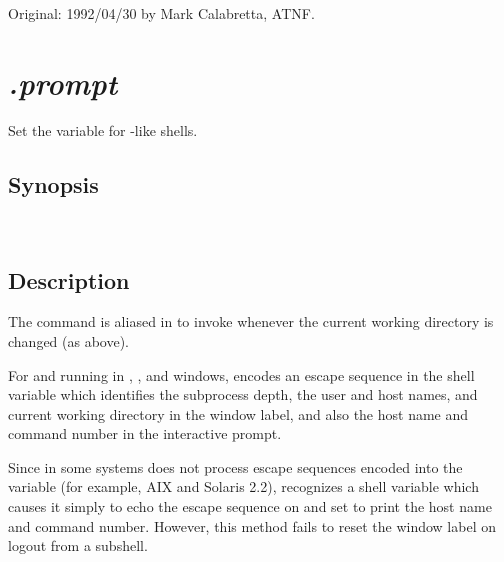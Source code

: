 Original: 1992/04/30 by Mark Calabretta, ATNF.


\newpage
\section{\textit{.prompt}}
\label{.prompt}




Set the  variable for -like shells.

\subsection*{Synopsis}

\begin{synopsis}
   \\
\end{synopsis}

\subsection*{Description}

The  command is aliased in  to invoke
 whenever the current working directory is changed (as above).

For  and  running in ,
, and  windows,  encodes an
escape sequence in the  shell variable which identifies the
subprocess depth, the user and host names, and current working directory in
the window label, and also the host name and command number in the interactive
prompt.

Since  in some systems does not process escape sequences encoded
into the  variable (for example, AIX and Solaris 2.2),
 recognizes a shell variable  which causes
it simply to echo the escape sequence on  and set 
to print the host name and command number.  However, this method fails to
reset the window label on logout from a subshell.

